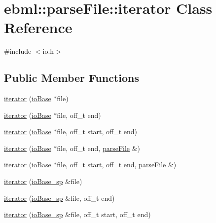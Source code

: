 \hypertarget{classebml_1_1parseFile_1_1iterator}{}\section{ebml\+:\+:parse\+File\+:\+:iterator Class Reference}
\label{classebml_1_1parseFile_1_1iterator}


{\ttfamily \#include $<$io.\+h$>$}

\subsection*{Public Member Functions}
\begin{DoxyCompactItemize}
\item 
\mbox{\hyperlink{classebml_1_1parseFile_1_1iterator_ab2f11b4ec9f9a3a4a075d294821cf06e}{iterator}} (\mbox{\hyperlink{classebml_1_1ioBase}{io\+Base}} $\ast$file)
\item 
\mbox{\hyperlink{classebml_1_1parseFile_1_1iterator_a8d3db3fee812b47a91982c61f0cc640f}{iterator}} (\mbox{\hyperlink{classebml_1_1ioBase}{io\+Base}} $\ast$file, off\+\_\+t end)
\item 
\mbox{\hyperlink{classebml_1_1parseFile_1_1iterator_a4b498f07c0bc4cf2ef05472ab7515508}{iterator}} (\mbox{\hyperlink{classebml_1_1ioBase}{io\+Base}} $\ast$file, off\+\_\+t start, off\+\_\+t end)
\item 
\mbox{\hyperlink{classebml_1_1parseFile_1_1iterator_af5038abb12db4272932c0da3008e6520}{iterator}} (\mbox{\hyperlink{classebml_1_1ioBase}{io\+Base}} $\ast$file, off\+\_\+t end, \mbox{\hyperlink{classebml_1_1parseFile}{parse\+File}} \&)
\item 
\mbox{\hyperlink{classebml_1_1parseFile_1_1iterator_ac1835c1d13e542b6472a36cb87c4a3dd}{iterator}} (\mbox{\hyperlink{classebml_1_1ioBase}{io\+Base}} $\ast$file, off\+\_\+t start, off\+\_\+t end, \mbox{\hyperlink{classebml_1_1parseFile}{parse\+File}} \&)
\item 
\mbox{\hyperlink{classebml_1_1parseFile_1_1iterator_aafcfec4606f110567a37b1960de8be23}{iterator}} (\mbox{\hyperlink{namespaceebml_a7bb59128ac6af27e47367938a846b569}{io\+Base\+\_\+sp}} \&file)
\item 
\mbox{\hyperlink{classebml_1_1parseFile_1_1iterator_aaac9d534845abb17da0b691eeb16c412}{iterator}} (\mbox{\hyperlink{namespaceebml_a7bb59128ac6af27e47367938a846b569}{io\+Base\+\_\+sp}} \&file, off\+\_\+t end)
\item 
\mbox{\hyperlink{classebml_1_1parseFile_1_1iterator_a1366b7ab26a2a322f86b023794255152}{iterator}} (\mbox{\hyperlink{namespaceebml_a7bb59128ac6af27e47367938a846b569}{io\+Base\+\_\+sp}} \&file, off\+\_\+t start, off\+\_\+t end)

\end{DoxyCompactItemize}
